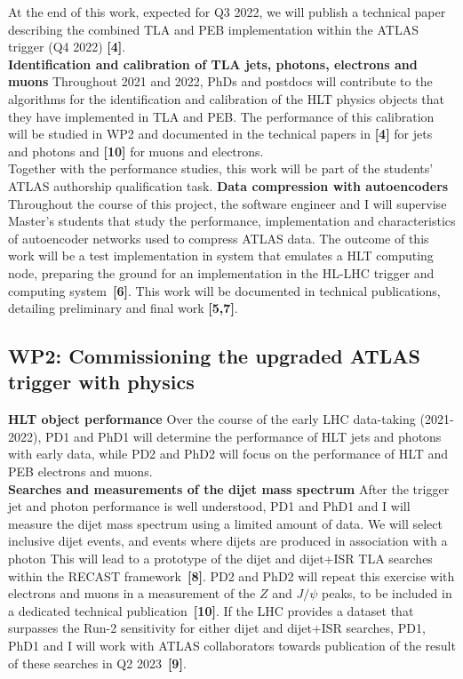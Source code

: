 At the end of this work, expected for Q3 2022, we will publish a technical paper describing the combined TLA and PEB implementation within the ATLAS trigger (Q4 2022) \textbf{[4]}. \\
\textbf{Identification and calibration of TLA jets, photons, electrons and muons} Throughout 2021 and 2022, PhDs and postdocs will contribute to the algorithms for the identification and calibration of the HLT physics objects that they have implemented in TLA and PEB. 
The performance of this calibration will be studied in WP2 and documented in the technical papers in \textbf{[4]} for jets and photons and \textbf{[10]} for muons and electrons.\\
Together with the performance studies, this work will be part of the students' ATLAS authorship qualification task.
\textbf{Data compression with autoencoders} Throughout the course of this project, the software engineer and I will supervise Master's students that study the performance, implementation and characteristics of autoencoder networks used to compress ATLAS data. 
The outcome of this work will be a test implementation in system that emulates a HLT computing node, preparing the ground for an implementation in the HL-LHC trigger and computing system~\textbf{[6]}. 
This work will be documented in technical publications, detailing preliminary and final work \textbf{[5,7]}.

\subsection{WP2: Commissioning the upgraded ATLAS trigger with physics}

\textbf{HLT object performance} Over the course of the early LHC data-taking (2021-2022), 
PD1 and PhD1 will determine the performance of HLT jets and photons with early data, while PD2 and PhD2 will focus on the performance of HLT and PEB electrons and muons. \\
\textbf{Searches and measurements of the dijet mass spectrum} After the trigger jet and photon performance is well understood, PD1 and PhD1 and I will measure the dijet mass spectrum using a limited amount of data. 
We will select inclusive dijet events, and events where dijets are produced in association with a photon
This will lead to a prototype of the dijet and dijet+ISR TLA searches within the RECAST framework~\textbf{[8]}.   
PD2 and PhD2 will repeat this exercise with electrons and muons in a measurement of the $Z$ and $J/\psi$ peaks, 
to be included in a dedicated technical publication~\textbf{[10]}. 
If the LHC provides a dataset that surpasses the Run-2 sensitivity for either dijet and dijet+ISR searches, 
PD1, PhD1 and I will work with ATLAS collaborators towards publication of the result of these searches in Q2 2023~\textbf{[9]}.

